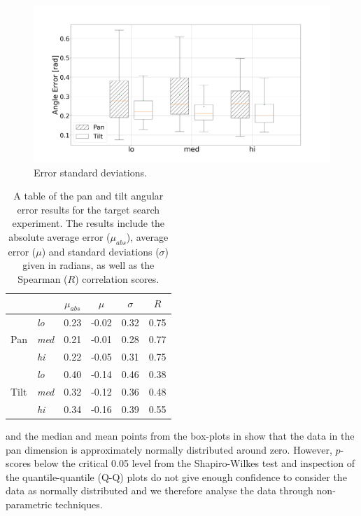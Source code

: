 \documentclass[sigconf, screen=true, anonymous=true]{acmart}
\begin{document}
\begin{figure}
  \centering
  \includegraphics[clip, trim=80 -70 100 0, width=0.8\columnwidth]{figures/err_boxplot_std.png}
  \caption{Error standard deviations.}\label{fig:err-boxplot-std}
\end{figure}

\begin{table}
  \centering
  \caption{A table of the pan and tilt angular error results for the target search experiment. The results include the absolute average error ($\mu_{abs}$), average error ($\mu$) and standard deviations ($\sigma$) given in radians, as well as the Spearman ($R$) correlation scores.}\label{tab:results}
  \begin{tabular}{llcccc}
    \toprule
    \multicolumn{2}{c}{} & $\mu_{abs}$ & $\mu$ & $\sigma$ & $R$ \\\midrule
    & \emph{lo}  & 0.23 & -0.02 & 0.32 & 0.75 \\%
    Pan & \emph{med} & 0.21 & -0.01 & 0.28 & 0.77 \\%
    & \emph{hi}  & 0.22 & -0.05 & 0.31 & 0.75 \\\midrule
    & \emph{lo}  & 0.40 & -0.14 & 0.46 & 0.38 \\%
    Tilt & \emph{med} & 0.32 & -0.12 & 0.36 & 0.48 \\%
    & \emph{hi}  & 0.34 & -0.16 & 0.39 & 0.55 \\
    \bottomrule
  \end{tabular}
\end{table}

 and the median and mean points from the box-plots in  show that the data in the pan dimension is approximately normally distributed around zero.
However, $p$-scores below the critical 0.05 level from the Shapiro-Wilkes test and inspection of the quantile-quantile (Q-Q) plots do not give enough confidence to consider the data as normally distributed and we therefore analyse the data through non-parametric techniques. 
\end{document}
